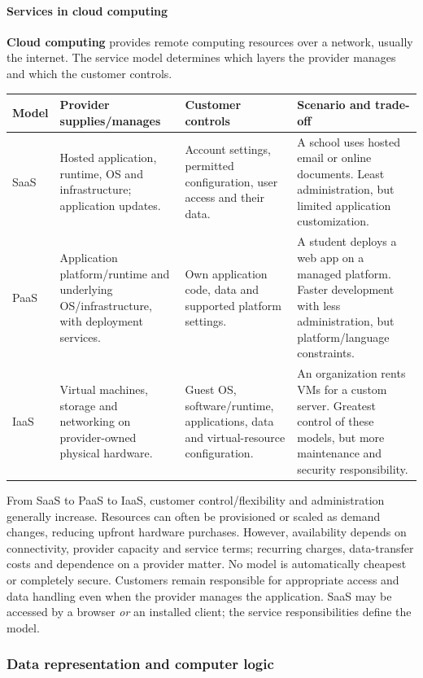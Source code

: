 \documentclass[a4paper,12pt]{article}
\begin{document}
\paragraph{Services in cloud computing}
\textbf{Cloud computing} provides remote computing resources over a network, usually the internet. The service model determines which layers the provider manages and which the customer controls.
\begin{center}
\begin{tabularx}{0.98\linewidth}{p{1.5cm} X X X}
\toprule
\textbf{Model} & \textbf{Provider supplies/manages} & \textbf{Customer controls} & \textbf{Scenario and trade-off} \\
\midrule
SaaS & Hosted application, runtime, OS and infrastructure; application updates. & Account settings, permitted configuration, user access and their data. & A school uses hosted email or online documents. Least administration, but limited application customization. \\
PaaS & Application platform/runtime and underlying OS/infrastructure, with deployment services. & Own application code, data and supported platform settings. & A student deploys a web app on a managed platform. Faster development with less administration, but platform/language constraints. \\
IaaS & Virtual machines, storage and networking on provider-owned physical hardware. & Guest OS, software/runtime, applications, data and virtual-resource configuration. & An organization rents VMs for a custom server. Greatest control of these models, but more maintenance and security responsibility. \\
\bottomrule
\end{tabularx}
\end{center}
From SaaS to PaaS to IaaS, customer control/flexibility and administration generally increase. Resources can often be provisioned or scaled as demand changes, reducing upfront hardware purchases. However, availability depends on connectivity, provider capacity and service terms; recurring charges, data-transfer costs and dependence on a provider matter. No model is automatically cheapest or completely secure. Customers remain responsible for appropriate access and data handling even when the provider manages the application. SaaS may be accessed by a browser \emph{or} an installed client; the service responsibilities define the model.

\newpage
\subsubsection{Data representation and computer logic}
\end{document}
